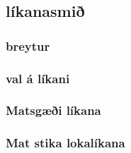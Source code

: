 \documentclass[
  12pt,
]{article}
\begin{document}
\hypertarget{luxedkanasmiuxf0}{%
\subsection{líkanasmið}\label{luxedkanasmiuxf0}}

\hypertarget{breytur-1}{%
\subsubsection{breytur}\label{breytur-1}}

\hypertarget{val-uxe1-luxedkani}{%
\subsubsection{val á líkani}\label{val-uxe1-luxedkani}}

\hypertarget{matsguxe6uxf0i-luxedkana}{%
\subsubsection{Matsgæði líkana}\label{matsguxe6uxf0i-luxedkana}}

\hypertarget{mat-stika-lokaluxedkana}{%
\subsubsection{Mat stika lokalíkana}\label{mat-stika-lokaluxedkana}}
\end{document}
